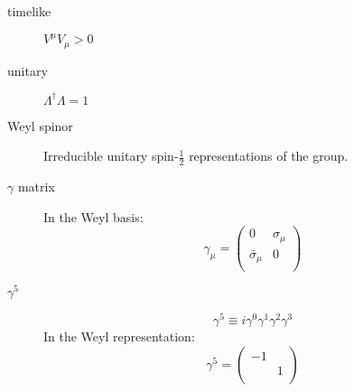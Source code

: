 \begin{description}
    \item [timelike]	$V^\mu V_\mu > 0$

    \item [unitary] $\Lambda^{\dag}\Lambda = 1$

    \item [Weyl spinor] Irreducible unitary spin-$\frac{1}{2}$
	representations of the \Poincare{} group.

    \item [$\gamma$ matrix]
	In the Weyl basis:
	\[  \gamma_\mu = 
	    \begin{pmatrix}
		0   & \sigma_\mu    \\
		\bar{\sigma}_\mu  & 0	\\
	    \end{pmatrix} 
	\]
    \item [$\gamma^5$]
	\[
	    \gamma^5 \equiv i\gamma^0\gamma^1\gamma^2\gamma^3
	\]
	In the Weyl representation:
	\[
	    \gamma^5 = 
	    \begin{pmatrix}
		-\mathcal{1}	&   \\
		    & \mathcal{1}   \\
	    \end{pmatrix}
	\]
\end{description}
